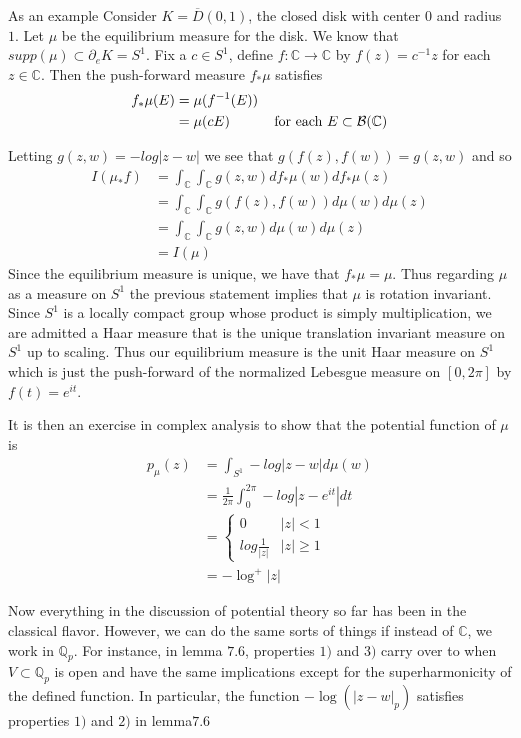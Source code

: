 \documentclass{amsart}
\newcommand{\C}{\mathbb{C}}
\newcommand{\Q}{\mathbb{Q}}
\newcommand{\MCB}{\mathcal{B}}
\begin{document}
As an example Consider $K = \overline{D}(0,1)$, the closed disk with center $0$ and radius $1$. Let $\mu$ be the equilibrium measure for the disk. We know that $supp(\mu) \subset \partial_eK = S^1$. Fix a $c \in S^1$, define $f:\C \rightarrow \C$ by $f(z) = c^{-1}z$ for each $z \in \C$. Then the push-forward measure $f_*\mu$ satisfies \begin{align*}
f_*\mu(E) 
&= \mu(f^{-1}(E)) \\
&= \mu(cE) \hspace{10mm}\text{ for each } E \subset \MCB(\C) 
\end{align*}

Letting $g(z,w) = -log|z-w|$ we see that $g(f(z),f(w)) = g(z,w)$ and so 
\begin{align*}
I(\mu_*f) 
&= \int_{\C}\int_{\C}g(z,w)df_*\mu(w)df_*\mu(z)\\
&= \int_{\C}\int_{\C}g(f(z),f(w))d\mu(w)d\mu(z)\\
&= \int_{\C}\int_{\C}g(z,w)d\mu(w)d\mu(z)\\
&= I(\mu)
\end{align*} 
Since the equilibrium measure is unique, we have that $f_*\mu = \mu$. Thus regarding $\mu$ as a measure on $S^1$ the previous statement implies that $\mu$ is rotation invariant. Since $S^1$ is a locally compact group whose product is simply multiplication, we are admitted a Haar measure that is the unique translation invariant measure on $S^1$ up to scaling. Thus our equilibrium measure is the unit Haar measure on $S^1$ which is just the push-forward of the normalized Lebesgue measure on $[0,2\pi]$ by $f(t) = e^{it}$.

It is then an exercise in complex analysis to show that the potential function of $\mu$ is 
\begin{align*}
p_\mu(z) 
&= \int_{S^1}-log|z-w|d\mu(w)\\
&= \frac{1}{2\pi}\int_0^{2\pi}-log|z-e^{it}|dt\\
&= \begin{cases} 0 & |z|<1 \\ log\frac{1}{|z|} & |z| \geq
1
\end{cases}\\
&= -\log^+|z|
\end{align*} 

Now everything in the discussion of potential theory so far has been in the classical flavor. However, we can do the same sorts of things if instead of $\C$, we work in $\Q_p$. For instance, in lemma $7.6$, properties $1)$ and $3)$ carry over to when $V \subset \Q_p$ is open and have the same implications except for the superharmonicity of the defined function. In particular, the function $-\log(|z-w|_p)$ satisfies properties $1)$ and $2)$ in lemma$ 7.6$ 
\end{document}
